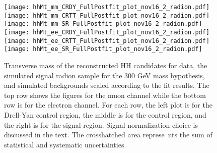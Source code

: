 \begin{figure}[tbp]
  \begin{center}
    \texttt{[image: hhMt\_mm\_CRDY\_FullPostfit\_plot\_nov16\_2\_radion.pdf]}
    \texttt{[image: hhMt\_mm\_CRTT\_FullPostfit\_plot\_nov16\_2\_radion.pdf]}
    \texttt{[image: hhMt\_mm\_SR\_FullPostfit\_plot\_nov16\_2\_radion.pdf]} \\
    \texttt{[image: hhMt\_ee\_CRDY\_FullPostfit\_plot\_nov16\_2\_radion.pdf]}
    \texttt{[image: hhMt\_ee\_CRTT\_FullPostfit\_plot\_nov16\_2\_radion.pdf]}
    \texttt{[image: hhMt\_ee\_SR\_FullPostfit\_plot\_nov16\_2\_radion.pdf]}
    \caption{Transverse mass of the reconstructed HH candidates for data, the simulated signal radion sample
    for the 300 GeV mass hypothesis, and simulated backgrounds scaled according to the fit results. The top
    row shows the figures for the muon channel while the bottom row is for the electron channel. For each row,
    the left plot is for the Drell-Yan control region, the middle is for the \ttbar control region, and the right
    is for the signal region. Signal normalization choice is discussed in the text. The crosshatched area represe\
nts
    the sum of statistical and systematic uncertainties.}
    \label{fig:MCcomparisons_radion}
%                                                                                                                 
  \end{center}
\end{figure}






